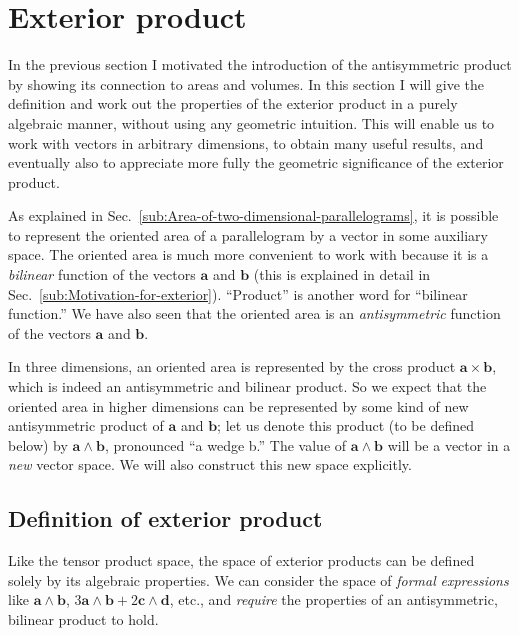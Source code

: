 \section{Exterior product\label{sub:Definition-of-the-exterior}}

In the previous section I motivated the introduction of the antisymmetric
product by showing its connection to areas and volumes. In this section
I will give the definition and work out the properties of the exterior
product in a purely algebraic manner, without using any geometric
intuition. This will enable us to work with vectors in arbitrary dimensions,
to obtain many useful results, and eventually also to appreciate more
fully the geometric significance of the exterior product. 

As explained in Sec.~\ref{sub:Area-of-two-dimensional-parallelograms},
it is possible to represent the oriented area of a parallelogram by
a vector in some auxiliary space. The oriented area is much more convenient
to work with because it is a \emph{bilinear} function of the vectors
$\mathbf{a}$ and $\mathbf{b}$ (this is explained in detail in Sec.~\ref{sub:Motivation-for-exterior}).
{}``Product'' is another word for {}``bilinear function.'' We
have also seen that the oriented area is an \emph{antisymmetric} function
of the vectors $\mathbf{a}$ and $\mathbf{b}$.

In three dimensions, an oriented area is represented by the cross
product $\mathbf{a}\times\mathbf{b}$, which is indeed an antisymmetric
and bilinear product. So we expect that the oriented area in higher
dimensions can be represented by some kind of new antisymmetric product
of $\mathbf{a}$ and $\mathbf{b}$; let us denote this product (to
be defined below) by $\mathbf{a}\wedge\mathbf{b}$, pronounced {}``a
wedge b.'' The value of $\mathbf{a}\wedge\mathbf{b}$ will be a vector
in a \emph{new} vector space. We will also construct this new space
explicitly.


\subsection{Definition of exterior product}

Like the tensor product space, the space of exterior products can
be defined solely by its algebraic properties. We can consider the
space of \emph{formal} \emph{expressions} like $\mathbf{a}\wedge\mathbf{b}$,
$3\mathbf{a}\wedge\mathbf{b}+2\mathbf{c}\wedge\mathbf{d}$, etc.,
and \emph{require} the properties of an antisymmetric, bilinear product
to hold.

